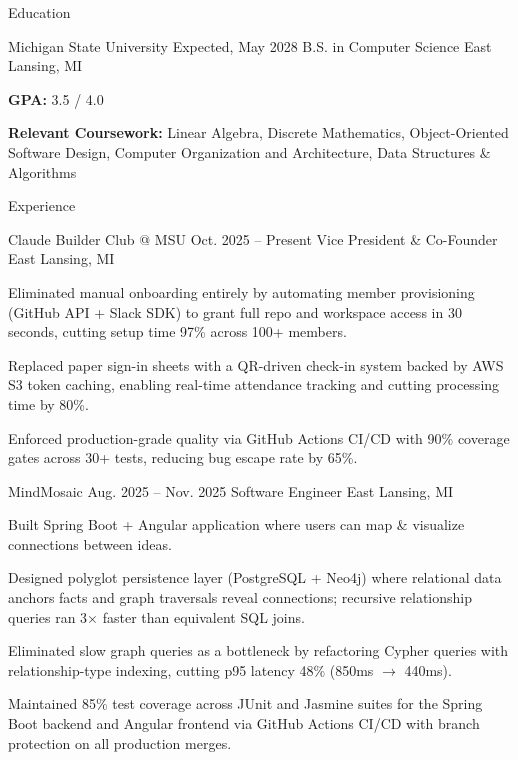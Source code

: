 \documentclass[
	11pt
]{../resume}
\begin{document}
	\begin{rSection}{E}{ducation}
		\begin{rSectionEntry}
			{Michigan State University}
			{Expected, May 2028}
			{B.S. in Computer Science}
			{}
			{East Lansing, MI}

			\item \textbf{GPA:} 3.5 / 4.0
			\item \textbf{Relevant Coursework:} Linear Algebra, Discrete Mathematics, Object-Oriented Software Design, Computer Organization and Architecture, Data Structures \& Algorithms
		\end{rSectionEntry}
	\end{rSection}

	\begin{rSection}{E}{xperience}
		\begin{rSectionEntry}
			{Claude Builder Club @ MSU}
			{Oct. 2025 -- Present}
			{Vice President \& Co-Founder}
			{}
			{East Lansing, MI}

			\item Eliminated manual onboarding entirely by automating member provisioning (GitHub API + Slack SDK) to grant full repo and workspace access in 30 seconds, cutting setup time 97\% across 100+ members.
			\item Replaced paper sign-in sheets with a QR-driven check-in system backed by AWS S3 token caching, enabling real-time attendance tracking and cutting processing time by 80\%.
			\item Enforced production-grade quality via GitHub Actions CI/CD with 90\% coverage gates across 30+ tests, reducing bug escape rate by 65\%.
		\end{rSectionEntry}

		\begin{rSectionEntry}
			{MindMosaic}
			{Aug. 2025 -- Nov. 2025}
			{Software Engineer}
			{}
			{East Lansing, MI}

			\item Built Spring Boot + Angular application where users can map \& visualize connections between ideas.
			\item Designed polyglot persistence layer (PostgreSQL + Neo4j) where relational data anchors facts and graph traversals reveal connections; recursive relationship queries ran 3$\times$ faster than equivalent SQL joins.
			\item Eliminated slow graph queries as a bottleneck by refactoring Cypher queries with relationship-type indexing, cutting p95 latency 48\% (850ms $\rightarrow$ 440ms).
			\item Maintained 85\% test coverage across JUnit and Jasmine suites for the Spring Boot backend and Angular frontend via GitHub Actions CI/CD with branch protection on all production merges.
		\end{rSectionEntry}
	\end{rSection}
\end{document}
